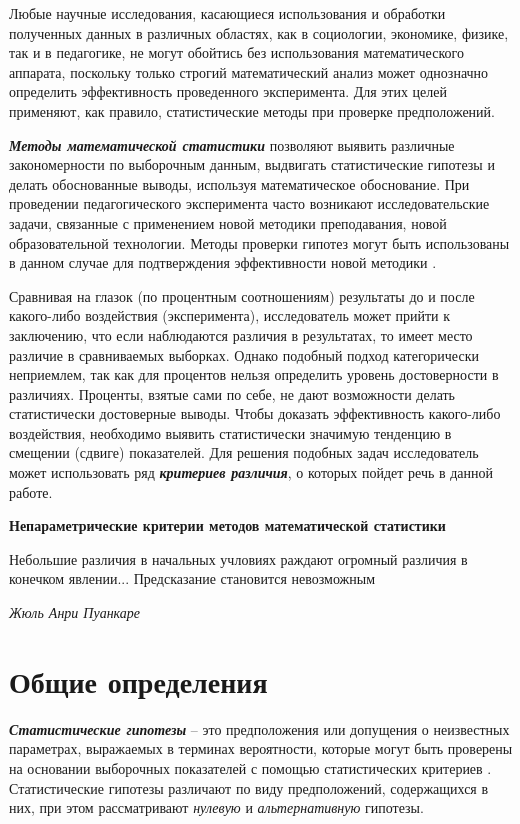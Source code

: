 \documentclass[12pt]{article}
\begin{document}
Любые научные исследования, касающиеся использования и обработки полученных данных в различных областях, как в социологии, экономике, физике, так и в педагогике, не могут обойтись без использования математического аппарата, поскольку только строгий математический анализ может однозначно определить эффективность проведенного эксперимента. Для этих целей применяют, как правило, статистические методы при проверке предположений.

\textbf{\textit{Методы математической статистики}} позволяют выявить различные закономерности по выборочным данным, выдвигать статистические гипотезы и делать обоснованные выводы, используя математическое обоснование. При проведении педагогического эксперимента часто возникают исследовательские задачи, связанные с применением новой методики преподавания, новой образовательной технологии. Методы проверки гипотез могут быть использованы в данном случае для подтверждения эффективности новой методики \cite{4}.

Сравнивая на глазок (по процентным соотношениям) результаты до и после какого-либо воздействия (эксперимента), исследователь может прийти к заключению, что если наблюдаются различия в результатах, то имеет место различие в сравниваемых выборках. Однако подобный подход категорически неприемлем, так как для процентов нельзя определить уровень достоверности в различиях. Проценты, взятые сами по себе, не дают возможности делать статистически достоверные выводы. Чтобы доказать эффективность какого-либо воздействия, необходимо выявить статистически значимую тенденцию в смещении (сдвиге) показателей. Для решения подобных задач исследователь может использовать ряд \textbf{\textit{критериев различия}}, о которых пойдет речь в данной работе.

\medskip
\textbf{Непараметрические критерии методов математической статистики}

\epigraph{Небольшие различия в начальных учловиях раждают огромный различия в конечком явлении... Предсказание становится невозможным}{\textit{Жюль Анри Пуанкаре}}

\section{Общие определения}

\medskip
\textbf{\textit{Статистические гипотезы}} – это предположения или допущения о неизвестных параметрах, выражаемых в терминах вероятности, которые могут быть проверены на основании выборочных показателей с помощью статистических критериев \cite{1}.
Статистические гипотезы различают по виду предположений, содержащихся в них, при этом рассматривают \textit{нулевую} и \textit{альтернативную} гипотезы.
\end{document}

